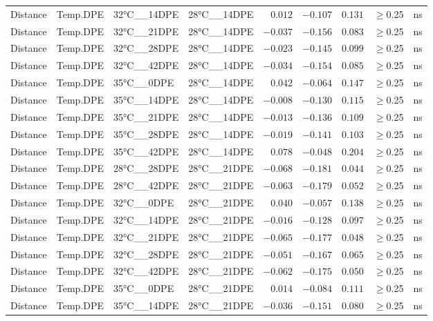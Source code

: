 \documentclass[
]{article}
\begin{document}
\begin{longtable}{llllrrrrl}
Distance & Temp.DPE & 32°C\_\_14DPE & 28°C\_\_14DPE & $0.012$ & $-0.107$ & $0.131$ & $\geq$0.25 & ns \\ 
Distance & Temp.DPE & 32°C\_\_21DPE & 28°C\_\_14DPE & $-0.037$ & $-0.156$ & $0.083$ & $\geq$0.25 & ns \\ 
Distance & Temp.DPE & 32°C\_\_28DPE & 28°C\_\_14DPE & $-0.023$ & $-0.145$ & $0.099$ & $\geq$0.25 & ns \\ 
Distance & Temp.DPE & 32°C\_\_42DPE & 28°C\_\_14DPE & $-0.034$ & $-0.154$ & $0.085$ & $\geq$0.25 & ns \\ 
Distance & Temp.DPE & 35°C\_\_0DPE & 28°C\_\_14DPE & $0.042$ & $-0.064$ & $0.147$ & $\geq$0.25 & ns \\ 
Distance & Temp.DPE & 35°C\_\_14DPE & 28°C\_\_14DPE & $-0.008$ & $-0.130$ & $0.115$ & $\geq$0.25 & ns \\ 
Distance & Temp.DPE & 35°C\_\_21DPE & 28°C\_\_14DPE & $-0.013$ & $-0.136$ & $0.109$ & $\geq$0.25 & ns \\ 
Distance & Temp.DPE & 35°C\_\_28DPE & 28°C\_\_14DPE & $-0.019$ & $-0.141$ & $0.103$ & $\geq$0.25 & ns \\ 
Distance & Temp.DPE & 35°C\_\_42DPE & 28°C\_\_14DPE & $0.078$ & $-0.048$ & $0.204$ & $\geq$0.25 & ns \\ 
Distance & Temp.DPE & 28°C\_\_28DPE & 28°C\_\_21DPE & $-0.068$ & $-0.181$ & $0.044$ & $\geq$0.25 & ns \\ 
Distance & Temp.DPE & 28°C\_\_42DPE & 28°C\_\_21DPE & $-0.063$ & $-0.179$ & $0.052$ & $\geq$0.25 & ns \\ 
Distance & Temp.DPE & 32°C\_\_0DPE & 28°C\_\_21DPE & $0.040$ & $-0.057$ & $0.138$ & $\geq$0.25 & ns \\ 
Distance & Temp.DPE & 32°C\_\_14DPE & 28°C\_\_21DPE & $-0.016$ & $-0.128$ & $0.097$ & $\geq$0.25 & ns \\ 
Distance & Temp.DPE & 32°C\_\_21DPE & 28°C\_\_21DPE & $-0.065$ & $-0.177$ & $0.048$ & $\geq$0.25 & ns \\ 
Distance & Temp.DPE & 32°C\_\_28DPE & 28°C\_\_21DPE & $-0.051$ & $-0.167$ & $0.065$ & $\geq$0.25 & ns \\ 
Distance & Temp.DPE & 32°C\_\_42DPE & 28°C\_\_21DPE & $-0.062$ & $-0.175$ & $0.050$ & $\geq$0.25 & ns \\ 
Distance & Temp.DPE & 35°C\_\_0DPE & 28°C\_\_21DPE & $0.014$ & $-0.084$ & $0.111$ & $\geq$0.25 & ns \\ 
Distance & Temp.DPE & 35°C\_\_14DPE & 28°C\_\_21DPE & $-0.036$ & $-0.151$ & $0.080$ & $\geq$0.25 & ns \\ 

\end{longtable}
\end{document}

